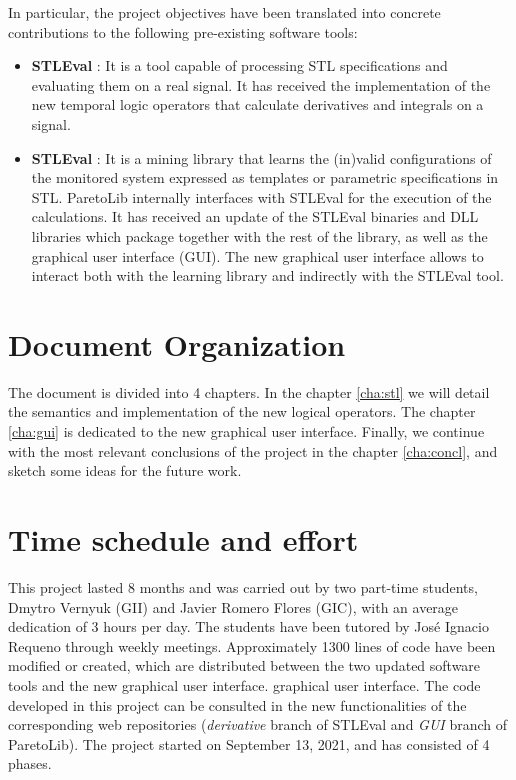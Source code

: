 In particular, the project objectives have been translated into concrete contributions to the following pre-existing software tools:

\begin{itemize}
\item \textbf{STLEval} \cite{StlEval}: It is a tool capable of processing STL specifications and evaluating them on a real signal. It has received the implementation of the new temporal logic operators that calculate derivatives and integrals on a signal.
\item \textbf{STLEval} \cite{StlEval}: It is a mining library that learns the (in)valid configurations of the monitored system expressed as templates or parametric specifications in STL.
ParetoLib internally interfaces with STLEval for the execution of the calculations. It has received an update of the STLEval binaries and DLL libraries which package together with the rest of the library, as well as the graphical user interface (GUI). The new graphical user interface  allows to interact both with the learning library and indirectly with the STLEval tool.
\end{itemize}

\section{Document Organization}

The document is divided into 4 chapters. In the chapter \ref{cha:stl} we will detail the semantics and implementation of the new logical operators. The chapter \ref{cha:gui} is dedicated to the new graphical user interface. Finally, we continue with the most relevant conclusions of the project in the chapter \ref{cha:concl}, and sketch some ideas for the future work. %

\section{Time schedule and effort}
This project lasted 8 months and was carried out by two part-time students, Dmytro Vernyuk (GII) and Javier Romero Flores (GIC), with an average dedication of 3 hours per day. The students have been tutored by José Ignacio Requeno through weekly meetings. Approximately 1300 lines of code have been modified or created, which are distributed between the two updated software tools and the new graphical user interface.
graphical user interface. The code developed in this project can be consulted in the new functionalities of the corresponding web repositories (\textit{derivative} branch of STLEval and \textit{GUI} branch of ParetoLib). The project started on September 13, 2021, and has consisted of 4 phases.


